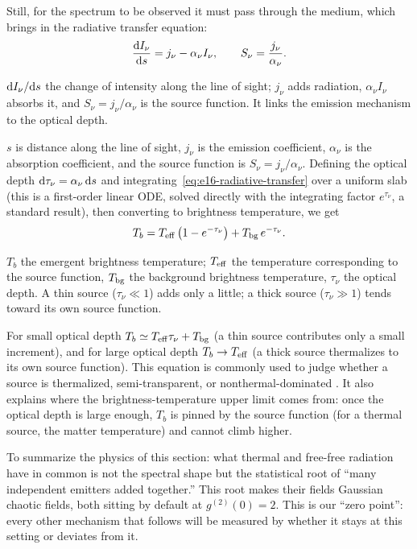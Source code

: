 Still, for the spectrum to be observed it must pass through the medium, which brings in the radiative transfer equation:
\begin{equation}
  \frac{{\rm d}I_\nu}{{\rm d}s}=j_\nu-\alpha_\nu I_\nu,
  \qquad
  S_\nu=\frac{j_\nu}{\alpha_\nu}.
  \label{eq:e16-radiative-transfer}
\end{equation}
\begin{formulaexplain}
\({\rm d}I_\nu/{\rm d}s\) the change of intensity along the line of sight; \(j_\nu\) adds radiation, \(\alpha_\nu I_\nu\) absorbs it, and \(S_\nu=j_\nu/\alpha_\nu\) is the source function. It links the emission mechanism to the optical depth.
\end{formulaexplain}
\(s\) is distance along the line of sight, \(j_\nu\) is the emission coefficient, \(\alpha_\nu\) is the absorption coefficient, and the source function is \(S_\nu=j_\nu/\alpha_\nu\). Defining the optical depth \({\rm d}\tau_\nu=\alpha_\nu\,{\rm d}s\) and integrating~\eqref{eq:e16-radiative-transfer} over a uniform slab (this is a first-order linear ODE, solved directly with the integrating factor \(e^{\tau_\nu}\), a standard result), then converting to brightness temperature, we get
\begin{equation}
  T_b=T_{\rm eff}\left(1-e^{-\tau_\nu}\right)+T_{\rm bg}\,e^{-\tau_\nu}.
  \label{eq:e16-tb-transfer}
\end{equation}
\begin{formulaexplain}
\(T_b\) the emergent brightness temperature; \(T_{\rm eff}\) the temperature corresponding to the source function, \(T_{\rm bg}\) the background brightness temperature, \(\tau_\nu\) the optical depth. A thin source (\(\tau_\nu\ll1\)) adds only a little; a thick source (\(\tau_\nu\gg1\)) tends toward its own source function.
\end{formulaexplain}
For small optical depth \(T_b\simeq T_{\rm eff}\tau_\nu+T_{\rm bg}\) (a thin source contributes only a small increment), and for large optical depth \(T_b\to T_{\rm eff}\) (a thick source thermalizes to its own source function). This equation is commonly used to judge whether a source is thermalized, semi-transparent, or nonthermal-dominated \citep{1979rpa..book.....R,2011piim.book.....D,1985ARA&A..23..169D}. It also explains where the brightness-temperature upper limit comes from: once the optical depth is large enough, \(T_b\) is pinned by the source function (for a thermal source, the matter temperature) and cannot climb higher.

To summarize the physics of this section: what thermal and free-free radiation have in common is not the spectral shape but the statistical root of ``many independent emitters added together.'' This root makes their fields Gaussian chaotic fields, both sitting by default at \(g^{(2)}(0)=2\). This is our ``zero point'': every other mechanism that follows will be measured by whether it stays at this setting or deviates from it.

